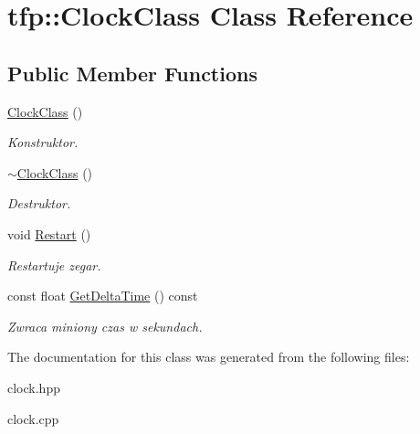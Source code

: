 \hypertarget{classtfp_1_1_clock_class}{}\section{tfp\+:\+:Clock\+Class Class Reference}
\label{classtfp_1_1_clock_class}
\subsection*{Public Member Functions}
\begin{DoxyCompactItemize}
\item 
\mbox{\label{classtfp_1_1_clock_class_adde3feaf78998365d896233c55ee7afa}} 
\mbox{\hyperlink{classtfp_1_1_clock_class_adde3feaf78998365d896233c55ee7afa}{Clock\+Class}} ()
\begin{DoxyCompactList}\small\item\em Konstruktor. \end{DoxyCompactList}\item 
\mbox{\label{classtfp_1_1_clock_class_abfb7964af48bf2a5bc7a99025b47f798}} 
\mbox{\hyperlink{classtfp_1_1_clock_class_abfb7964af48bf2a5bc7a99025b47f798}{$\sim$\+Clock\+Class}} ()
\begin{DoxyCompactList}\small\item\em Destruktor. \end{DoxyCompactList}\item 
\mbox{\label{classtfp_1_1_clock_class_a1ab26448019bb72f368ce49d5db8f743}} 
void \mbox{\hyperlink{classtfp_1_1_clock_class_a1ab26448019bb72f368ce49d5db8f743}{Restart}} ()
\begin{DoxyCompactList}\small\item\em Restartuje zegar. \end{DoxyCompactList}\item 
\mbox{\label{classtfp_1_1_clock_class_a2d29510591ec634222b118aa2ef598f2}} 
const float \mbox{\hyperlink{classtfp_1_1_clock_class_a2d29510591ec634222b118aa2ef598f2}{Get\+Delta\+Time}} () const
\begin{DoxyCompactList}\small\item\em Zwraca miniony czas w sekundach. \end{DoxyCompactList}\end{DoxyCompactItemize}


The documentation for this class was generated from the following files\+:\begin{DoxyCompactItemize}
\item 
clock.\+hpp\item 
clock.\+cpp\end{DoxyCompactItemize}
